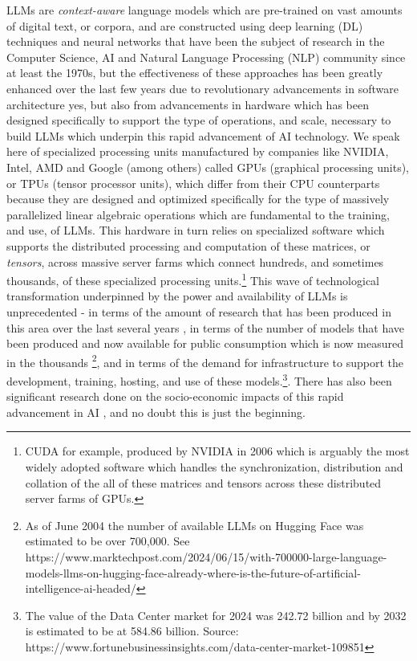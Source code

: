 \documentclass[final]{clv2025}
\begin{document}
LLMs are \textit{context-aware} language models which are pre-trained on vast amounts of digital text, or corpora, and are constructed using deep learning (DL) techniques and neural networks that have been the subject of research in the Computer Science, AI and Natural Language Processing (NLP) community since at least the 1970s, but the effectiveness of these approaches has been greatly enhanced over the last few years due to revolutionary advancements in software architecture yes, but also from advancements in hardware which has been designed specifically to support the type of operations, and scale, necessary to build LLMs which underpin this rapid advancement of AI technology. We speak here of specialized processing units manufactured by companies like NVIDIA, Intel, AMD and Google (among others) called GPUs (graphical processing units), or TPUs (tensor processor units), which differ from their CPU counterparts because they are designed and optimized specifically for the type of massively parallelized linear algebraic operations which are fundamental to the training, and use, of LLMs. This hardware in turn relies on specialized software which supports the distributed processing and computation of these matrices, or \textit{tensors}, across massive server farms which connect hundreds, and sometimes thousands, of these specialized processing units.\footnote{CUDA for example, produced by NVIDIA in 2006 which is arguably the most widely adopted software which handles the synchronization, distribution and collation of the all of these matrices and tensors across these distributed server farms of GPUs.} This wave of technological transformation underpinned by the power and availability of LLMs is unprecedented - in terms of the amount of research that has been produced in this area over the last several years \cite{naveed2024comprehensiveoverviewlargelanguage} \cite{fan2023bibliometricreviewlargelanguage}, in terms of the number of models that have been produced and now available for public consumption which is now measured in the thousands \footnote{As of June 2004 the number of available LLMs on Hugging Face was estimated to be over 700,000. See https://www.marktechpost.com/2024/06/15/with-700000-large-language-models-llms-on-hugging-face-already-where-is-the-future-of-artificial-intelligence-ai-headed/}, and in terms of the demand for infrastructure to support the development, training, hosting, and use of these models.\footnote{The value of the Data Center market for 2024 was 242.72 billion and by 2032 is estimated to be at 584.86 billion. Source: https://www.fortunebusinessinsights.com/data-center-market-109851}. There has also been significant research done on the socio-economic impacts of this rapid advancement in AI \cite{10.1093/pnasnexus/pgae191} \cite{El-Farr24}, and no doubt this is just the beginning.
\end{document}

